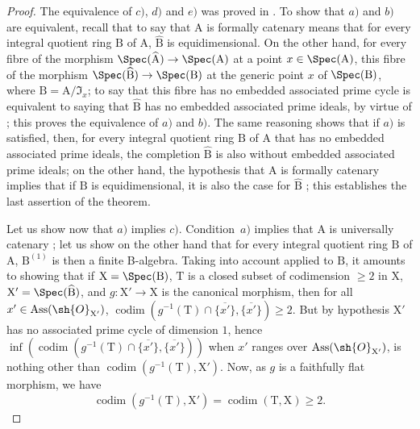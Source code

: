 \begin{proof}
The equivalence of $c)$, $d)$ and $e)$ was proved in .
To show that $a)$ and $b)$ are equivalent, recall  that to say that $\mathrm{A}$ is formally catenary means that for every integral quotient ring $\mathrm{B}$ of $\mathrm{A}$, $\widehat{\mathrm{B}}$ is equidimensional.
On the other hand, for every fibre of the morphism $\Spec(\widehat{\mathrm{A}})\to\Spec(\mathrm{A})$ at a point $x\in\Spec(\mathrm{A})$, this fibre of the morphism $\Spec(\widehat{\mathrm{B}})\to\Spec(\mathrm{B})$ at the generic point $x$ of $\Spec(\mathrm{B})$, where $\mathrm{B}=\mathrm{A}/\mathfrak{I}_x$; to say that this fibre has no embedded associated prime cycle is equivalent to saying that $\widehat{\mathrm{B}}$ has no embedded associated prime ideals, by virtue of ; this proves the equivalence of $a)$ and $b)$.
The same reasoning shows that if $a)$ is satisfied, then, for every integral quotient ring $\mathrm{B}$ of $\mathrm{A}$ that has no embedded associated prime ideals, the completion $\widehat{\mathrm{B}}$ is also without embedded associated prime ideals; on the other hand, the hypothesis that $\mathrm{A}$ is formally catenary implies that if $\mathrm{B}$ is equidimensional, it is also the case for $\widehat{\mathrm{B}}$ ; this establishes the last assertion of the theorem.

Let us show now that $a)$ implies $c)$.
Condition~$a)$ implies that $\mathrm{A}$ is universally catenary ; let us show on the other hand that for every integral quotient ring $\mathrm{B}$ of $\mathrm{A}$, $\mathrm{B}^{(1)}$ is then a finite B-algebra.
Taking into account  applied to $\mathrm{B}$, it amounts to showing that if $\mathrm{X}=\Spec(\mathrm{B})$, $\mathrm{T}$ is a closed subset of codimension $\geqslant 2$ in $\mathrm{X}$, $\mathrm{X}'=\Spec(\widehat{\mathrm{B}})$, and $g:\mathrm{X}'\to\mathrm{X}$ is the canonical morphism, then for all $x'\in\operatorname{Ass}(\sh{O}_{\mathrm{X}'})$, $\operatorname{codim}(g^{-1}(\mathrm{T})\cap\overline{\{x'\}},\overline{\{x'\}})\geqslant 2$.
But by hypothesis $\mathrm{X}'$ has no associated prime cycle of dimension $1$, hence $\inf(\operatorname{codim}(g^{-1}(\mathrm{T})\cap\overline{\{x'\}},\overline{\{x'\}}))$ when $x'$ ranges over $\operatorname{Ass}(\sh{O}_{\mathrm{X}'})$, is nothing other than $\operatorname{codim}(g^{-1}(\mathrm{T}),\mathrm{X}')$.
Now, as $g$ is a faithfully flat morphism, we have 
\[
  \operatorname{codim}(g^{-1}(\mathrm{T}),\mathrm{X}')=\operatorname{codim}(\mathrm{T},\mathrm{X})\geqslant 2.
\]


\end{proof}
